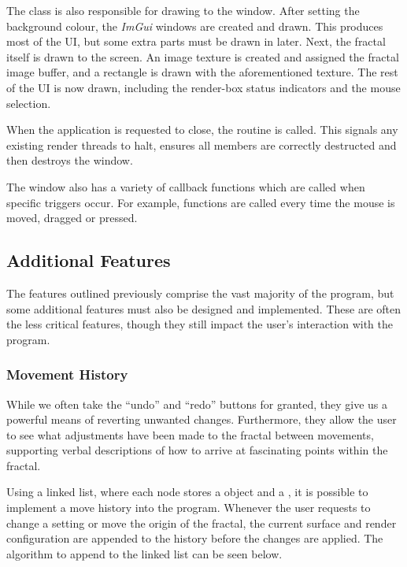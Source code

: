 The  class is also responsible for drawing to the window. After setting the background colour, the \textit{ImGui} windows are created and drawn. This produces most of the UI, but some extra parts must be drawn in later. Next, the fractal itself is drawn to the screen. An image texture is created and assigned the fractal image buffer, and a rectangle is drawn with the aforementioned texture. The rest of the UI is now drawn, including the render-box status indicators and the mouse selection.

When the application is requested to close, the  routine is called. This signals any existing render threads to halt, ensures all members are correctly destructed and then destroys the window.

The window also has a variety of callback functions which are called when specific triggers occur. For example, functions are called every time the mouse is moved, dragged or pressed.

\subsection{Additional Features}

The features outlined previously comprise the vast majority of the program, but some additional features must also be designed and implemented. These are often the less critical features, though they still impact the user's interaction with the program.  

\subsubsection{Movement History}

While we often take the ``undo'' and ``redo'' buttons for granted, they give us a powerful means of reverting unwanted changes. Furthermore, they allow the user to see what adjustments have been made to the fractal between movements, supporting verbal descriptions of how to arrive at fascinating points within the fractal.

Using a linked list, where each node stores a  object and a , it is possible to implement a move history into the program. Whenever the user requests to change a setting or move the origin of the fractal, the current surface and render configuration are appended to the history before the changes are applied. The algorithm to append to the linked list can be seen below.

